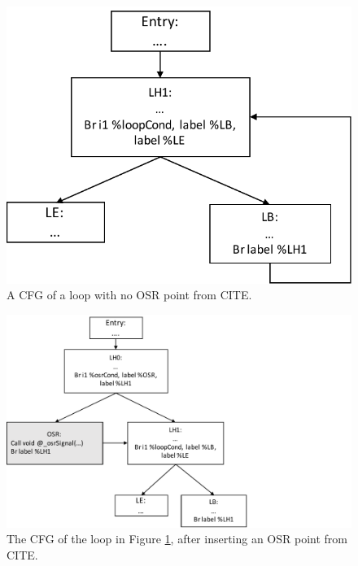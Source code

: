 \begin{figure}[h]
\centering
\includegraphics[scale=0.5]{Figures/BaseCFG}
\decoRule
\caption[A CFG of a loop with no OSR point]{A CFG of a loop with no OSR point from CITE.}
\label{BaseCFG}
\end{figure}

\begin{figure}[h]
\centering
\includegraphics[scale=0.5]{Figures/InsertCFG}
\decoRule
\caption[The CFG of the loop in Figure \ref{BaseCFG}, after inserting an OSR point]{The CFG of the loop in Figure \ref{BaseCFG}, after inserting an OSR point from CITE.}
\label{InsertCFG}
\end{figure}


